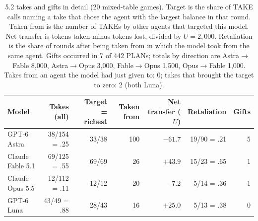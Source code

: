 \begin{table}[H]
\centering\scriptsize
\setlength{\tabcolsep}{3pt}
\caption{5.2 takes and gifts in detail (20 mixed-table games). Target is the share of TAKE calls naming a take that chose the agent with the largest balance in that round. Taken from is the number of TAKEs by other agents that targeted this model. Net transfer is tokens taken minus tokens lost, divided by $U=2{,}000$. Retaliation is the share of rounds after being taken from in which the model took from the same agent. Gifts occurred in 7 of 442 PLANs; totals by direction are Astra$\to$Fable 8,000, Astra$\to$Opus 3,000, Fable$\to$Opus 1,500, Opus$\to$Fable 1,000. Takes from an agent the model had just given to: 0; takes that brought the target to zero: 2 (both Luna).}
\label{tab:arena-take-detail}
\begin{tabular}{@{}lrrrrrr@{}}
\toprule
Model & Takes (all) & Target = richest & Taken from & Net transfer ($U$) & Retaliation & Gifts \\
\midrule
GPT-6 Astra & 38/154 = .25 & 33/38 & 100 & $-61.7$ & 19/90 = .21 & 5 \\
Claude Fable 5.1 & 69/125 = .55 & 69/69 & 26 & $+43.9$ & 15/23 = .65 & 1 \\
Claude Opus 5.5 & 12/112 = .11 & 12/12 & 20 & $-7.2$ & 5/14 = .36 & 1 \\
GPT-6 Luna & 43/49 = .88 & 28/43 & 16 & $+25.0$ & 5/13 = .38 & 0 \\
\bottomrule
\end{tabular}
\end{table}
